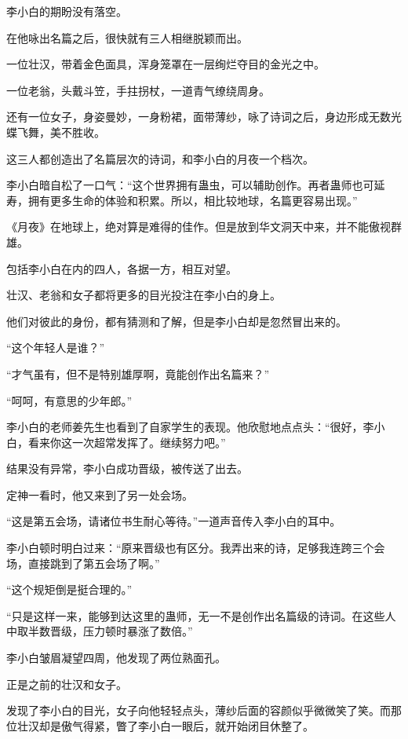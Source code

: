 
\begin{this_body}

李小白的期盼没有落空。

在他咏出名篇之后，很快就有三人相继脱颖而出。

一位壮汉，带着金色面具，浑身笼罩在一层绚烂夺目的金光之中。

一位老翁，头戴斗笠，手拄拐杖，一道青气缭绕周身。

还有一位女子，身姿曼妙，一身粉裙，面带薄纱，咏了诗词之后，身边形成无数光蝶飞舞，美不胜收。

这三人都创造出了名篇层次的诗词，和李小白的月夜一个档次。

李小白暗自松了一口气：“这个世界拥有蛊虫，可以辅助创作。再者蛊师也可延寿，拥有更多生命的体验和积累。所以，相比较地球，名篇更容易出现。”

《月夜》在地球上，绝对算是难得的佳作。但是放到华文洞天中来，并不能傲视群雄。

包括李小白在内的四人，各据一方，相互对望。

壮汉、老翁和女子都将更多的目光投注在李小白的身上。

他们对彼此的身份，都有猜测和了解，但是李小白却是忽然冒出来的。

“这个年轻人是谁？”

“才气虽有，但不是特别雄厚啊，竟能创作出名篇来？”

“呵呵，有意思的少年郎。”

李小白的老师姜先生也看到了自家学生的表现。他欣慰地点点头：“很好，李小白，看来你这一次超常发挥了。继续努力吧。”

结果没有异常，李小白成功晋级，被传送了出去。

定神一看时，他又来到了另一处会场。

“这是第五会场，请诸位书生耐心等待。”一道声音传入李小白的耳中。

李小白顿时明白过来：“原来晋级也有区分。我弄出来的诗，足够我连跨三个会场，直接跳到了第五会场了啊。”

“这个规矩倒是挺合理的。”

“只是这样一来，能够到达这里的蛊师，无一不是创作出名篇级的诗词。在这些人中取半数晋级，压力顿时暴涨了数倍。”

李小白皱眉凝望四周，他发现了两位熟面孔。

正是之前的壮汉和女子。

发现了李小白的目光，女子向他轻轻点头，薄纱后面的容颜似乎微微笑了笑。而那位壮汉却是傲气得紧，瞥了李小白一眼后，就开始闭目休整了。


\end{this_body}
